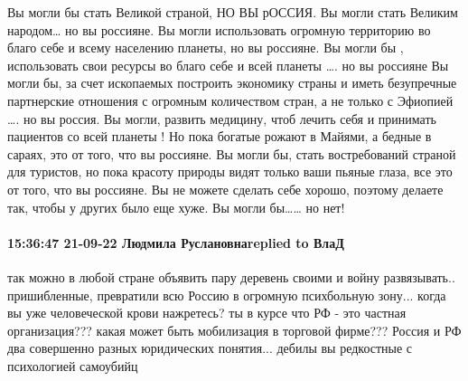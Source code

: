Вы могли бы стать Великой страной, НО ВЫ рОССИЯ.
Вы могли стать Великим народом… но вы россияне.
Вы могли использовать огромную территорию во благо себе и всему населению планеты, но вы россияне.
Вы могли бы , использовать свои ресурсы во благо себе и всей планеты …. но вы россияне
Вы могли бы, за счет ископаемых построить экономику страны и иметь безупречные партнерские отношения с огромным количеством стран, а не только с Эфиопией …. но вы россия.
Вы могли, развить медицину, чтоб лечить себя и принимать пациентов со всей планеты ! Но пока богатые рожают в Майями, а бедные в сараях, это от того, что вы россияне.
Вы могли бы, стать востребований страной для туристов, но пока красоту природы видят только ваши пьяные глаза, все это от того, что вы россияне.
Вы не можете сделать себе хорошо, поэтому делаете так, чтобы у других было еще хуже.
Вы могли бы…… но нет!

\paragraph{15:36:47 21-09-22 Людмила Руслановнаreplied to ВлаД}

так можно в любой стране объявить пару деревень своими и войну развязывать..
пришибленные, превратили всю Россию в огромную психбольную зону... когда вы уже
человеческой крови нажретесь? ты в курсе что РФ - это частная организация???
какая может быть мобилизация в торговой фирме??? Россия и РФ два совершенно
разных юридических понятия... дебилы вы редкостные с психологией самоубийц



